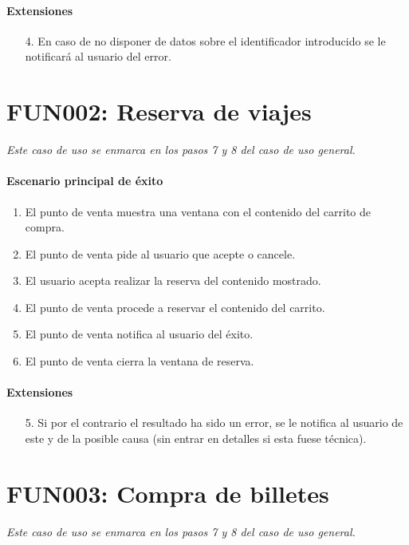     \paragraph{Extensiones}
    \begin{enumerate}
      \item[4.] En caso de no disponer de datos sobre el identificador introducido se le notificará al usuario del error.
    \end{enumerate}



\section{FUN002: Reserva de viajes}
  \emph{Este caso de uso se enmarca en los pasos 7 y 8 del caso de uso general.}
  \paragraph{Escenario principal de éxito}
  \begin{enumerate}
    \item El punto de venta muestra una ventana con el contenido del carrito de compra.
    \item El punto de venta pide al usuario que acepte o cancele.
    \item El usuario acepta realizar la reserva del contenido mostrado.
    \item El punto de venta procede a reservar el contenido del carrito.
    \item El punto de venta notifica al usuario del éxito.
    \item El punto de venta cierra la ventana de reserva.
  \end{enumerate}
  \paragraph{Extensiones}
  \begin{enumerate}
    \item[5.] Si por el contrario el resultado ha sido un error, se le notifica al usuario de este y de la posible causa (sin entrar en detalles si esta fuese técnica).
  \end{enumerate}



\section{FUN003: Compra de billetes}
  \emph{Este caso de uso se enmarca en los pasos 7 y 8 del caso de uso general.}
